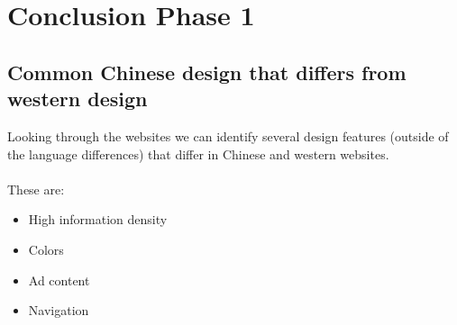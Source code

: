  
 
\newpage
 \section{Conclusion Phase 1}
 \subsection{Common Chinese design that differs from western design}
Looking through the websites we can identify several design features (outside of the language differences) that differ in Chinese and western websites. 
\\\\
These are:
 \begin{itemize}
 \item High information density
 \item Colors
 \item Ad content
 \item Navigation
 \end{itemize}
 
